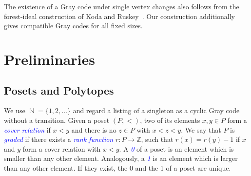 \documentclass[fontsize=11pt,a4paper,DIV=12]{scrartcl}
\newcommand{\defn}[1]{\textsl{\textcolor{Blue}{#1}}}
\DeclareMathOperator{\N}{\mathbb{N}}
\begin{document}

The existence of a Gray code under single vertex changes also follows from the forest-ideal construction of Koda and Ruskey~\cite{forestideals}. Our construction additionally gives compatible Gray codes for all fixed sizes.

\section{Preliminaries}\label{sec:prelim}

\subsection{Posets and Polytopes}
	We use $\N=\{1,2,\ldots\}$ and regard a listing of a singleton as a cyclic Gray code without a transition.
	Given a poset $(P,<)$, two of its elements $x,y\in P$ form a \defn{cover relation} if $x<y$ and there is no $z\in P$ with $x<z<y$. We say that $P$ is \defn{graded} if there exists a \defn{rank function} $r\colon P\to\mathbb Z$, such that $r(x)=r(y)-1$ if $x$ and $y$ form a cover relation with $x<y$. A \defn{0} of a poset is an element which is smaller than any other element. Analogously, a \defn{1} is an element which is larger than any other element. If they exist, the 0 and the 1 of a poset are unique.
\end{document}
